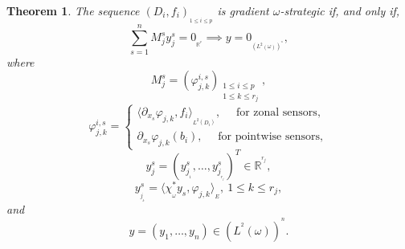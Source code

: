 \documentclass{article}
\newtheorem{theorem}{Theorem}
\begin{document}
\begin{theorem}
\label{th.sens}
The sequence $(D_i,f_i)_{_{1\leq i\leq p}}$ 
is gradient $\omega$-strategic 
if, and only if,
$$
\displaystyle\sum_{s=1}^{n}M_{j}^sy_j^s 
= 0_{_{\mathbb{R}^{^p}}} \implies y 
= 0_{_{(L^2(\omega))^{^n}}},
$$
where
$$
M_j^s = \left(\varphi_{j,k}^{i,s}\right)_{\substack{1
\leq i \leq p \\ 1 \leq k \leq r_j}},
$$
$$ 
\varphi_{j,k}^{i,s} 
= \left\{
\begin{array}{ll}
\langle \partial_{x_s} \varphi_{j,k}, f_i\rangle_{_{L^2(D_i)}}, 
\quad \text{ for zonal sensors},\\
\partial_{x_s} \varphi_{j,k}(b_i), 
\quad \text{ for pointwise sensors},
\end{array}\right. 
$$
$$
y_j^s = \left(y_{j_{_1}}^s,\ldots,y_{j_{_{r_j}}}^s\right)^T 
\in \mathbb{R}^{^{r_j}},
$$
$$
y_{_{j_{_k}}}^s = \langle \chi_{_\omega}^*y_s,
\varphi_{j,k}\rangle_{_{E}}, \ 1\leq k \leq r_j,
$$
and
$$
y = \left(y_1,\ldots,y_n\right) \in (L^{^2}(\omega))^{^n}.
$$
\end{theorem}
\end{document}
